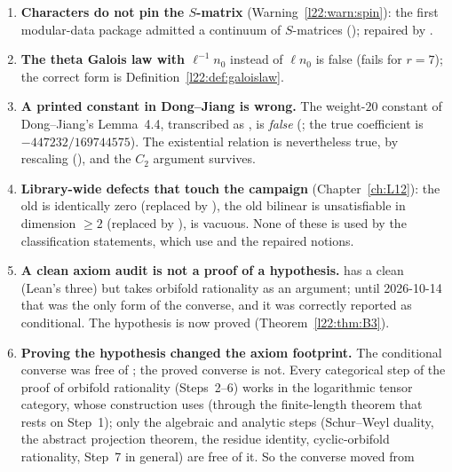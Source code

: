 \begin{warning}[title={Traps and dead ends of the $c=1$ campaign}]
\begin{enumerate}
\item \textbf{Characters do not pin the $S$-matrix} (Warning~\ref{l22:warn:spin}): the first modular-data package
  admitted a continuum of $S$-matrices (); repaired by .
\item \textbf{The theta Galois law with $\ell^{-1}n_0$} instead of $\ell n_0$ is false (fails for $r=7$); the
  correct form is Definition~\ref{l22:def:galoislaw}.
\item \textbf{A printed constant in Dong--Jiang is wrong.} The weight-$20$ constant of Dong--Jiang's Lemma~4.4, transcribed as
  , is \emph{false} (; the true coefficient is
  $-447232/169744575$). The existential relation  is nevertheless true, by rescaling
  (), and the $C_2$ argument survives.
\item \textbf{Library-wide defects that touch the campaign} (Chapter~\ref{ch:L12}): the old  is
  identically zero (replaced by ), the old bilinear  is unsatisfiable in dimension
  $\ge2$ (replaced by ),  is vacuous. None of these is used by the
  classification statements, which use  and the repaired notions.
\item \textbf{A clean axiom audit is not a proof of a hypothesis.}  has a clean
   (Lean's three) but takes orbifold rationality as an argument; until 2026-10-14 that was the only form of the
  converse, and it was correctly reported as conditional. The hypothesis is now proved (Theorem~\ref{l22:thm:B3}).
\item \textbf{Proving the hypothesis changed the axiom footprint.} The conditional converse was free of ;
  the proved converse  is not. Every categorical step of the proof of orbifold rationality (Steps~2--6)
  works in the logarithmic tensor category, whose construction uses  (through the finite-length theorem
  that rests on Step~1); only the algebraic and analytic steps (Schur--Weyl duality, the abstract projection theorem, the
  residue identity, cyclic-orbifold rationality, Step~7 in general) are free of it. So the converse moved from

\end{enumerate}
\end{warning}
